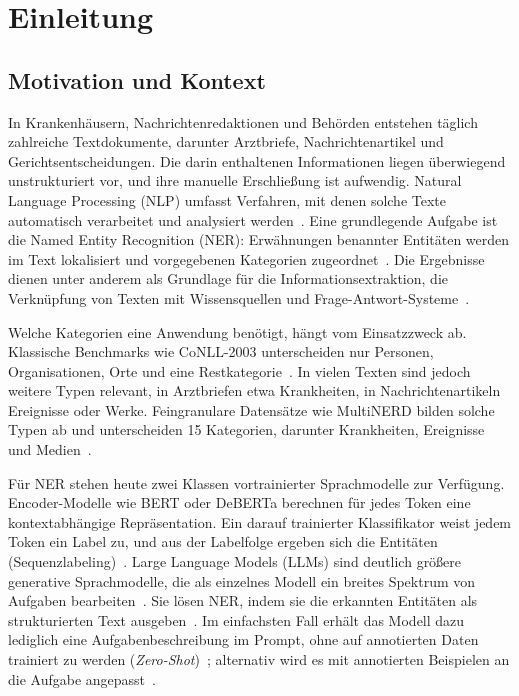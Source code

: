 %

\chapter{Einleitung}
\label{chap:einleitung}

\section{Motivation und Kontext}
\label{sec:motivation_kontext}

In Krankenhäusern, Nachrichtenredaktionen und Behörden entstehen täglich
zahlreiche Textdokumente, darunter Arztbriefe, Nachrichtenartikel und
Gerichtsentscheidungen.
Die darin enthaltenen Informationen liegen überwiegend unstrukturiert vor,
und ihre manuelle Erschließung ist aufwendig.
Natural Language Processing (NLP) umfasst Verfahren, mit denen solche
Texte automatisch verarbeitet und analysiert
werden~\cite{jurafsky2024speech,manning1999foundations}.
Eine grundlegende Aufgabe ist die Named Entity Recognition (NER):
Erwähnungen benannter Entitäten werden im Text lokalisiert und
vorgegebenen Kategorien zugeordnet~\cite{li2018survey}.
Die Ergebnisse dienen unter anderem als Grundlage für
die Informationsextraktion, die Verknüpfung von Texten mit
Wissensquellen und Frage-Antwort-Systeme~\cite{jurafsky2024speech,keraghel2024recent}.

Welche Kategorien eine Anwendung benötigt, hängt vom Einsatzzweck ab.
Klassische Benchmarks wie CoNLL-2003 unterscheiden nur Personen,
Organisationen, Orte und eine Restkategorie~\cite{sang2003conll}.
In vielen Texten sind jedoch weitere Typen relevant, in Arztbriefen etwa
Krankheiten, in Nachrichtenartikeln Ereignisse oder Werke.
Feingranulare Datensätze wie MultiNERD bilden solche Typen ab und
unterscheiden 15 Kategorien, darunter Krankheiten, Ereignisse und
Medien~\cite{tedeschi2022multinerd}.

Für NER stehen heute zwei Klassen vortrainierter Sprachmodelle zur
Verfügung.
Encoder-Modelle wie BERT oder DeBERTa berechnen für jedes Token eine
kontextabhängige Repräsentation. Ein darauf trainierter Klassifikator
weist jedem Token ein Label zu, und aus der Labelfolge ergeben sich die
Entitäten (Sequenzlabeling)~\cite{devlin2019bert,he2021debertav3}.
Large Language Models (LLMs) sind deutlich größere generative
Sprachmodelle, die als einzelnes Modell ein breites Spektrum von Aufgaben
bearbeiten~\cite{brown2020language,zhao2023survey}.
Sie lösen NER, indem sie die erkannten Entitäten als strukturierten Text
ausgeben~\cite{zhan2026generativeNER,semin2026spanLabeling}.
Im einfachsten Fall erhält das Modell dazu lediglich eine
Aufgabenbeschreibung im Prompt, ohne auf annotierten Daten trainiert zu
werden (\emph{Zero-Shot})~\cite{brown2020language}; alternativ wird es mit
annotierten Beispielen an die Aufgabe angepasst~\cite{zhan2026generativeNER}.

